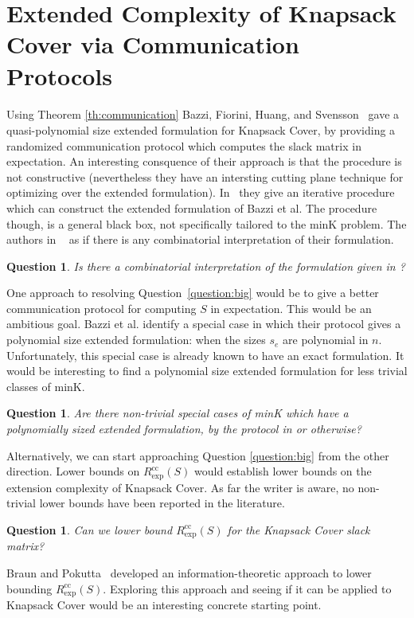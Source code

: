 \documentclass[letterpaper,12pt,oneside,onecolumn]{article}
\newtheorem{question}[fact]{Question}
\begin{document}
\section{Extended Complexity of Knapsack Cover via Communication Protocols}
\paragraph{}
Using Theorem \ref{th:communication} Bazzi, Fiorini, Huang, and Svensson~\cite{bazzi2017small} gave a quasi-polynomial size extended formulation for Knapsack Cover, by providing a randomized communication protocol which computes the slack matrix in expectation. An interesting consquence of their approach is that the procedure is not constructive (nevertheless they have an intersting cutting plane technique for optimizing over the extended formulation). In~\cite{fiorini2017strengthening} they give an iterative procedure which can construct the extended formulation of Bazzi et al. The procedure though, is a general black box, not specifically tailored to the minK problem. The authors in ~\cite{bazzi2017small} as if there is any combinatorial interpretation of their formulation.
\begin{question}
    Is there a combinatorial interpretation of the formulation given in \cite{bazzi2017small}?
\end{question}

One approach to resolving Question~\ref{question:big} would be to give a better communication protocol for computing $S$ in expectation. This would be an ambitious goal. Bazzi et al. identify a special case in which their protocol gives a polynomial size extended formulation: when the sizes $s_e$ are polynomial in $n$. Unfortunately, this special case is already known to have an exact formulation. It would be interesting to find a polynomial size extended formulation for less trivial classes of minK.
\begin{question}
Are there non-trivial special cases of minK which have a polynomially sized extended formulation, by the protocol in \cite{bazzi2017small} or otherwise?
\end{question}

Alternatively, we can start approaching Question \ref{question:big} from the other direction. Lower bounds on $R^\text{cc}_{\text{exp}}(S)$ would establish lower bounds on the extension complexity of Knapsack Cover. As far the writer is aware, no non-trivial lower bounds have been reported in the literature.
\begin{question}
    Can we lower bound $R^\text{cc}_{\text{exp}}(S)$ for the Knapsack Cover slack matrix?
\end{question}
Braun and Pokutta~\cite{braun2016common} developed an information-theoretic approach to lower bounding $R^\text{cc}_{\text{exp}}(S)$. Exploring this approach and seeing if it can be applied to Knapsack Cover would be an interesting concrete starting point.
\end{document}
